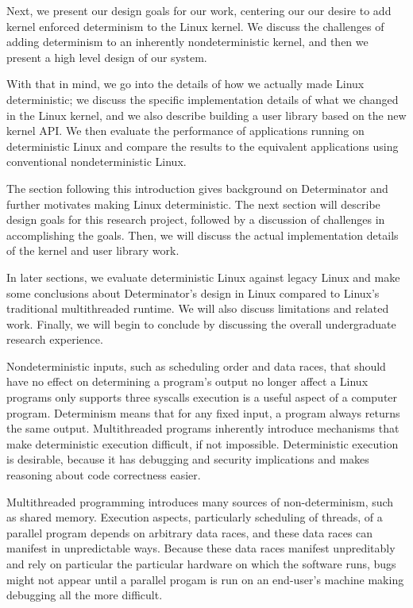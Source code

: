 Next, we present our design goals for our work, centering our our desire to add
kernel enforced determinism to the Linux kernel. We discuss the challenges of
adding determinism to an inherently nondeterministic kernel, and then we present
a high level design of our system.

With that in mind, we go into the details of how we actually made Linux
deterministic; we discuss the specific implementation details of what we changed
in the Linux kernel, and we also describe building a user library based on the
new kernel API. We then evaluate the performance of applications running on
deterministic Linux and compare the results to the equivalent applications
using conventional nondeterministic Linux.

\iffalse
The section following this introduction gives background on Determinator and
further motivates making Linux deterministic. The next section will describe
design goals for this research project, followed by a discussion of challenges
in accomplishing the goals. Then, we will discuss the actual implementation
details of the kernel and user library work.

In later sections, we evaluate deterministic Linux against legacy Linux and
make some conclusions about Determinator's design in Linux compared to Linux's
traditional multithreaded runtime. We will also discuss limitations and related
work. Finally, we will begin to conclude by discussing the overall undergraduate
research experience.

Nondeterministic inputs, such as scheduling order and data
races, that should have no effect on determining a program's output no longer
affect a Linux programs 
only supports three syscalls
 execution is a useful aspect of a computer program. Determinism
means that for any fixed input, a program always returns the same output.
Multithreaded programs inherently introduce mechanisms that make deterministic
execution difficult, if not impossible. Deterministic execution is desirable,
because it has debugging and security implications and makes reasoning about
code correctness easier.

Multithreaded programming introduces many sources of non-determinism, such as
shared memory. Execution aspects, particularly scheduling of threads, of a
parallel program depends on arbitrary data races, and these data races can
manifest in unpredictable ways. Because these data races manifest unpreditably
and rely on particular the particular hardware on which the software runs, bugs
might not appear until a parallel progam is run on an end-user's machine making
debugging all the more difficult.

